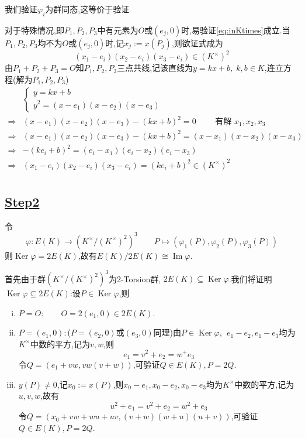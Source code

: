 \documentclass[12pt,A4paper,oneside,reqno]{amsart}
\numberwithin{equation}{section}
\theoremstyle{definition}
\theoremstyle{plain}
\theoremstyle{plain}
\numberwithin{equation}{section}
\theoremstyle{remark}
\DeclareMathOperator{\Ker}{\operatorname{Ker}}
\DeclareMathOperator{\Img}{\operatorname{Im}}
\begin{document}
我们验证$\varphi_i$为群同态,这等价于验证
\begin{center}
\end{center}
对于特殊情况,即$P_1,P_2,P_3$中有元素为$O$或$(e_j,0)$时,易验证\ref{eq:inKtimes}成立.当$P_1,P_2,P_3$均不为$O$或$(e_j,0)$时,记$x_j:=x(P_j)$,则欲证式成为
$$(x_1-e_i)(x_2-e_i)(x_3-e_i) \in (K^{\times})^2$$
由$P_1+P_2+P_3=O$知$P_1,P_2,P_3$三点共线,记该直线为$y=kx+b,\;k,b \in K$,连立方程(解为$P_1,P_2,P_3$)
\begin{equation*}
\begin{aligned}
&\begin{cases}
y=kx+b\\
y^2=(x-e_1)(x-e_2)(x-e_3)
\end{cases}\\
\Longrightarrow&(x-e_1)(x-e_2)(x-e_3)-(kx+b)^2=0 \qquad\text{ 有解 }x_1,x_2,x_3\\
\Longrightarrow&(x-e_1)(x-e_2)(x-e_3)-(kx+b)^2=(x-x_1)(x-x_2)(x-x_3)\\
\Longrightarrow&-(ke_i+b)^2=(e_i-x_1)(e_i-x_2)(e_i-x_3)\\
\Longrightarrow&(x_1-e_i)(x_2-e_i)(x_3-e_i)=(ke_i+b)^2 \in (K^{\times})^2\\
\end{aligned}
\end{equation*}
\subsection*{\underline{Step2}}
令
$$\varphi:E(K) \longrightarrow (K^{\times}/(K^{\times})^2)^3 \qquad P \longmapsto (\varphi_1(P),\varphi_2(P),\varphi_3(P))$$
则$\Ker \varphi =2E(K)$,故有$E(K)/2E(K) \cong \Img \varphi$.

首先由于群$(K^{\times}/(K^{\times})^2)^3$为2-Torsion群, $2E(K) \subseteq \Ker \varphi$.我们将证明$\Ker \varphi \subseteq 2E(K)$:设$P \in \Ker \varphi$,则
\begin{enumerate}[(i)]
	\item $P=O:\qquad O=2(e_1,0) \in 2E(K)$.
	\item $P=(e_1,0):$($P=(e_2,0)$或$(e_3,0)$同理)由$P \in \Ker \varphi$, $\;e_1-e_2,e_1-e_3$均为$K^{\times}$中数的平方,记为$v,w$,则
	$$e_1=v^2+e_2=w^+e_3$$
	令$Q=(e_1+vw,vw(v+w))$,可验证$Q \in E(K), P=2Q$.
	\item $y(P) \neq 0$,记$x_0:=x(P)$,则$x_0-e_1,x_0-e_2,x_0-e_3$均为$K^{\times}$中数的平方,记为$u,v,w$,故有
	$$u^2+e_1=v^2+e_2=w^2+e_3$$
	令$Q=(x_0+vw+wu+uv,(v+w)(w+u)(u+v))$,可验证$Q \in E(K), P=2Q$.
\end{enumerate}
\end{document}
